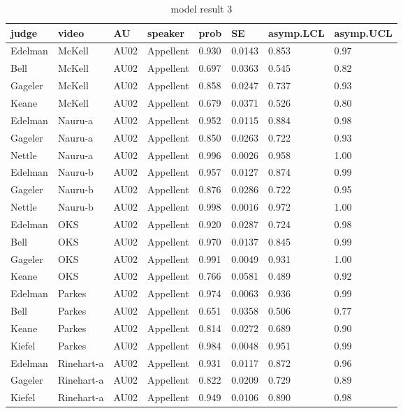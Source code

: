 \documentclass{monashthesis}
\begin{document}
\begin{center}
\begin{longtable}{llllllll}
\caption{\label{tab:result_3} model result 3}\\
\toprule
judge & video & AU & speaker & prob & SE & asymp.LCL & asymp.UCL \\
\midrule
\endhead
\bottomrule
\endfoot
Edelman & McKell & AU02 & Appellent & 0.930 & 0.0143 & 0.853 & 0.97 \\
Bell & McKell & AU02 & Appellent & 0.697 & 0.0363 & 0.545 & 0.82 \\
Gageler & McKell & AU02 & Appellent & 0.858 & 0.0247 & 0.737 & 0.93 \\
Keane & McKell & AU02 & Appellent & 0.679 & 0.0371 & 0.526 & 0.80 \\
Edelman & Nauru-a & AU02 & Appellent & 0.952 & 0.0115 & 0.884 & 0.98 \\
Gageler & Nauru-a & AU02 & Appellent & 0.850 & 0.0263 & 0.722 & 0.93 \\
Nettle & Nauru-a & AU02 & Appellent & 0.996 & 0.0026 & 0.958 & 1.00 \\
Edelman & Nauru-b & AU02 & Appellent & 0.957 & 0.0127 & 0.874 & 0.99 \\
Gageler & Nauru-b & AU02 & Appellent & 0.876 & 0.0286 & 0.722 & 0.95 \\
Nettle & Nauru-b & AU02 & Appellent & 0.998 & 0.0016 & 0.972 & 1.00 \\
Edelman & OKS & AU02 & Appellent & 0.920 & 0.0287 & 0.724 & 0.98 \\
Bell & OKS & AU02 & Appellent & 0.970 & 0.0137 & 0.845 & 0.99 \\
Gageler & OKS & AU02 & Appellent & 0.991 & 0.0049 & 0.931 & 1.00 \\
Keane & OKS & AU02 & Appellent & 0.766 & 0.0581 & 0.489 & 0.92 \\
Edelman & Parkes & AU02 & Appellent & 0.974 & 0.0063 & 0.936 & 0.99 \\
Bell & Parkes & AU02 & Appellent & 0.651 & 0.0358 & 0.506 & 0.77 \\
Keane & Parkes & AU02 & Appellent & 0.814 & 0.0272 & 0.689 & 0.90 \\
Kiefel & Parkes & AU02 & Appellent & 0.984 & 0.0048 & 0.951 & 0.99 \\
Edelman & Rinehart-a & AU02 & Appellent & 0.931 & 0.0117 & 0.872 & 0.96 \\
Gageler & Rinehart-a & AU02 & Appellent & 0.822 & 0.0209 & 0.729 & 0.89 \\
Kiefel & Rinehart-a & AU02 & Appellent & 0.949 & 0.0106 & 0.890 & 0.98 \\

\end{longtable}
\end{center}
\end{document}
